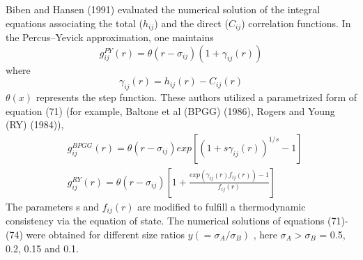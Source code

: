 \documentclass[12pt]{article}
\newcommand*{\1}{\hspace{1pt}}
\begin{document}
    Biben and Hansen (1991) evaluated the numerical solution of the integral equations associating
    the total ($h_{ij}$) and the direct ($C_{ij}$) correlation functions. In the Percus–Yevick approximation,
    one maintains
        \begin{equation}
        g^{PY}_{ij}(r) = \theta (r - \sigma_{ij})(1 + \gamma_{ij}(r))
        \end{equation}
    where
        \begin{equation}
            \gamma_{ij}(r) = h_{ij}(r) - C_{ij}(r)
        \end{equation}
    $\theta(x)$ represents the step function. These authors utilized a parametrized form of equation (71)
    (for example, Baltone et al (BPGG) (1986), Rogers and Young (RY) (1984)),
    \begin{align}
        &  g^{BPGG}_{ij}(r) = \theta (r - \sigma_{ij}) exp[(1 + s\gamma_{ij}(r))^{1/s} - 1 ] \\
        &  g^{RY}_{ij}(r) = \theta (r - \sigma_{ij}) \left[1 + 
        \frac{exp(\gamma_{ij}(r)f_{ij}(r)) - 1}{f_{ij}(r)} \right]
            \end{align}
    The parameters s and $f_{ij}(r)$ are modified to fulfill a thermodynamic consistency via
    the equation of state. The numerical solutions of equations (71)-(74) were obtained for
    different size ratios $y(= \sigma_A/\sigma_B)$ , here $\sigma_A > \sigma_B$ = 0.5, 0.2, 0.15 and 0.1.\\
\end{document}
